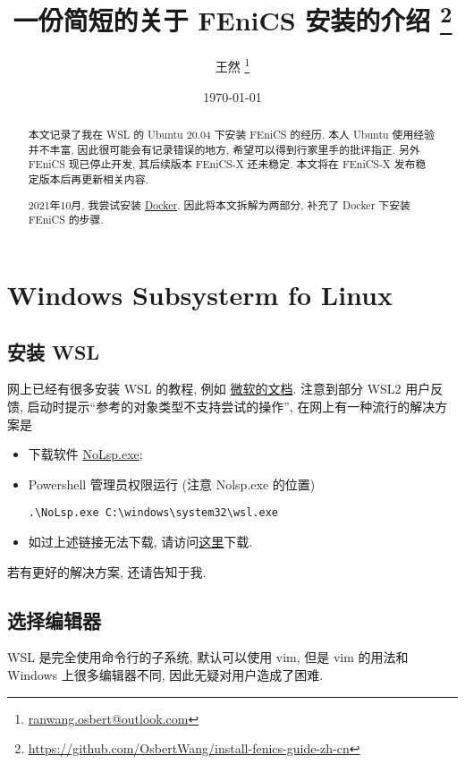 \documentclass[fontset=founder]{ctexrep}
\title{\bfseries 一份简短的关于 FEniCS 安装的介绍%
  \thanks{\url{https://github.com/OsbertWang/install-fenics-guide-zh-cn}}%
}
\author{王然%
  \thanks{\href{mailto:ranwang.osbert@outlook.com}%
    {\ttfamily ranwang.osbert@outlook.com}}%
}
\date{\today}
\begin{document}
  
\maketitle

\begin{abstract}
  
  本文记录了我在 WSL 的 Ubuntu 20.04 下安装 FEniCS 的经历.
  本人 Ubuntu 使用经验并不丰富,
  因此很可能会有记录错误的地方,
  希望可以得到行家里手的批评指正.
  另外 FEniCS 现已停止开发,
  其后续版本 FEniCS-X 还未稳定.
  本文将在 FEniCS-X 发布稳定版本后再更新相关内容.
  
  2021年10月,
  我尝试安装 \href{https://www.docker.com/get-started}{Docker}.
  因此将本文拆解为两部分,
  补充了 Docker 下安装 FEniCS 的步骤.
\end{abstract}

\tableofcontents

\chapter{Windows Subsysterm fo Linux}

\section{安装 WSL}\label{sec:wsl.install}

网上已经有很多安装 WSL 的教程,
例如%
\href{https://docs.microsoft.com/zh-cn/windows/wsl/install-win10}{微软的文档}.
注意到部分 WSL2 用户反馈,
启动时提示``参考的对象类型不支持尝试的操作'',
在网上有一种流行的解决方案是
\begin{itemize}
  \item 下载软件 \href{https://www.proxifier.com/tmp/Test20200228/NoLsp.exe}{NoLsp.exe};
  \item Powershell 管理员权限运行 (注意 Nolsp.exe 的位置)
  \begin{lstlisting}[gobble=4]
    .\NoLsp.exe C:\windows\system32\wsl.exe  
  \end{lstlisting}
  \item 如过上述链接无法下载,
  请访问\href{https://cowtransfer.com/s/626f2c73fc7a4f}{这里}下载.
\end{itemize}
若有更好的解决方案,
还请告知于我.

\section{选择编辑器}

WSL 是完全使用命令行的子系统,
默认可以使用 vim,
但是 vim 的用法和 Windows 上很多编辑器不同,
因此无疑对用户造成了困难.
\end{document}
